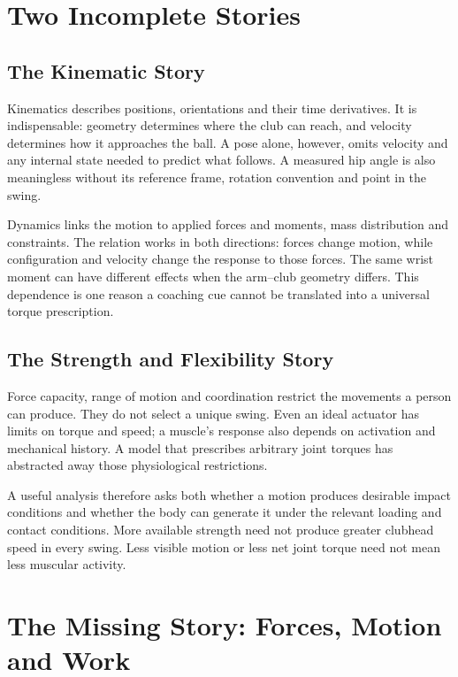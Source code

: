 \section{Two Incomplete Stories}\label{ch01:two-incomplete-stories}

\subsection{The Kinematic Story}\label{ch01:the-kinematic-story}

Kinematics describes positions, orientations and their time derivatives. It is indispensable: geometry determines where the club can reach, and velocity determines how it approaches the ball. A pose alone, however, omits velocity and any internal state needed to predict what follows. A measured hip angle is also meaningless without its reference frame, rotation convention and point in the swing.

Dynamics links the motion to applied forces and moments, mass distribution and constraints. The relation works in both directions: forces change motion, while configuration and velocity change the response to those forces. The same wrist moment can have different effects when the arm--club geometry differs. This dependence is one reason a coaching cue cannot be translated into a universal torque prescription.

\subsection{The Strength and Flexibility Story}\label{ch01:the-strength-and-flexibility-story}

Force capacity, range of motion and coordination restrict the movements a person can produce. They do not select a unique swing. Even an ideal actuator has limits on torque and speed; a muscle's response also depends on activation and mechanical history. A model that prescribes arbitrary joint torques has abstracted away those physiological restrictions.

A useful analysis therefore asks both whether a motion produces desirable impact conditions and whether the body can generate it under the relevant loading and contact conditions. More available strength need not produce greater clubhead speed in every swing. Less visible motion or less net joint torque need not mean less muscular activity.

\section{The Missing Story: Forces, Motion and Work}\label{ch01:the-missing-story-forces}

